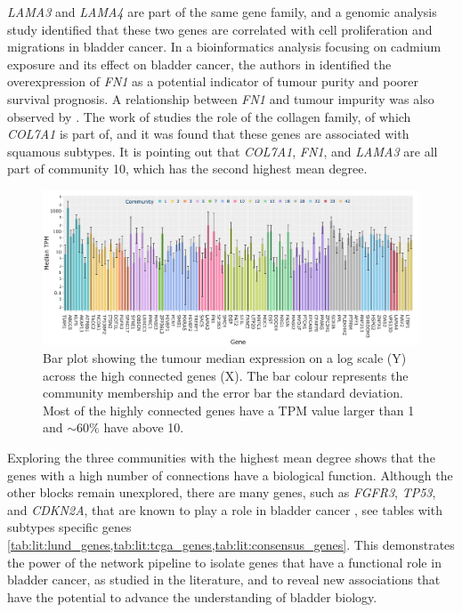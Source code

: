\textit{LAMA3} and \textit{LAMA4} are part of the same gene family, and a genomic analysis study  \citep{Ma2024-xc} identified that these two genes are correlated with cell proliferation and migrations in bladder cancer. In a bioinformatics analysis focusing on cadmium exposure and its effect on bladder cancer, the authors in \citep{Zhang2023-ul} identified the overexpression of \textit{FN1} as a potential indicator of tumour purity and poorer survival prognosis. A relationship between \textit{FN1} and tumour impurity was also observed by \citep{Zhang2023-kv}.
The work of \citet{Guo2023-sf} studies the role of the collagen family, of which \textit{COL7A1} is part of, and it was found that these genes are associated with squamous subtypes. It is pointing out that \textit{COL7A1}, \textit{FN1}, and \textit{LAMA3} are all part of community 10, which has the second highest mean degree.


\begin{figure}[!t]    
    \centering
    \includegraphics[width=1.0\textwidth,height=1.0\textheight,keepaspectratio]{Sections/Network_II/resources/reward/smallCom_Exp.png}
   \caption[Tumour median TPMs of highly connected genes]{Bar plot showing the tumour median expression on a log scale (Y) across the high connected genes (X). The bar colour represents the community membership and the error bar the standard deviation. Most of the highly connected genes have a TPM value larger than 1 and $\sim60\%$ have above 10. }
    \label{fig:N_II:exp_molecular_highCon}
\end{figure}


Exploring the three communities with the highest mean degree shows that the genes with a high number of connections have a biological function. Although the other blocks remain unexplored, there are many genes, such as \textit{FGFR3}, \textit{TP53}, and \textit{CDKN2A}, that are known to play a role in bladder cancer \citep{Robertson2017-mg,Kamoun2020-tj,Marzouka2018-ge}, see tables with subtypes specific genes \cref{tab:lit:lund_genes,tab:lit:tcga_genes,tab:lit:consensus_genes}. This demonstrates the power of the network pipeline to isolate genes that have a functional role in bladder cancer, as studied in the literature, and to reveal new associations that have the potential to advance the understanding of bladder biology.

